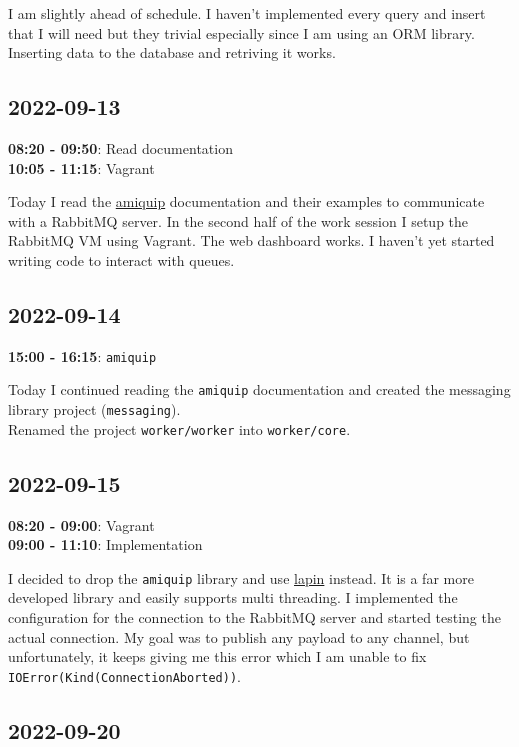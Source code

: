 \documentclass{article}
\begin{document}
I am slightly ahead of schedule. I haven't implemented every query and insert that I will need
but they trivial especially since I am using an ORM library. Inserting data to the database
and retriving it works.

\subsection{2022-09-13}

\textbf{08:20 - 09:50}: Read documentation \\
\textbf{10:05 - 11:15}: Vagrant

Today I read the \href{https://github.com/jgallagher/amiquip}{amiquip} documentation and their examples
to communicate with a RabbitMQ server. In the second half of the work session I
setup the RabbitMQ VM using Vagrant. The web dashboard works. I haven't yet started writing code
to interact with queues.

\subsection{2022-09-14}

\textbf{15:00 - 16:15}: \texttt{amiquip}

Today I continued reading the \texttt{amiquip} documentation
and created the messaging library project (\texttt{messaging}). \\
Renamed the project \texttt{worker/worker} into \texttt{worker/core}.

\pagebreak

\subsection{2022-09-15}

\textbf{08:20 - 09:00}: Vagrant \\
\textbf{09:00 - 11:10}: Implementation

I decided to drop the \texttt{amiquip} library and use
\href{https://github.com/amqp-rs/lapin}{lapin} instead.
It is a far more developed library and easily supports multi threading.
I implemented the configuration for the connection to the RabbitMQ server
and started testing the actual connection. My goal was to publish any payload to any channel,
but unfortunately, it keeps giving me this error which I am unable to fix \texttt{IOError(Kind(ConnectionAborted))}.

\subsection{2022-09-20}
\end{document}
